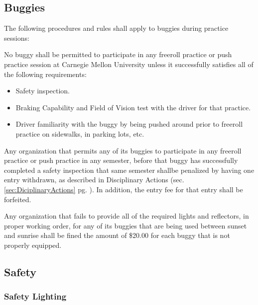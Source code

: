 \subsection{Buggies}
\label{subsec:Freeroll Buggies}

	The following procedures and rules shall apply to buggies during practice sessions:
	\newline

	\noindent No buggy shall be permitted to participate in any freeroll practice or push practice session at Carnegie Mellon University unless it successfully satisfies all of the following requirements:

	\begin{itemize}

		\item Safety inspection.

		\item Braking Capability and Field of Vision test with the driver for that practice.

		\item Driver familiarity with the buggy by being pushed around prior to freeroll practice on sidewalks, in parking lots, etc.

	\end{itemize}

	Any organization that permits any of its buggies to participate in any freeroll practice or push practice in any semester, before that buggy has successfully completed a safety inspection that same semester shallbe penalized by having one entry withdrawn, as described in Disciplinary Actions (sec. \ref{sec:DiciplinaryActions} pg. \pageref{sec:DiciplinaryActions}). 
	In addition, the entry fee for that entry shall be forfeited.

	Any organization that fails to provide all of the required lights and reflectors, in proper working order, for any of its buggies that are being used between sunset and sunrise shall be fined the amount of \$20.00 for each buggy that is not properly equipped.

\subsection{Safety}

\subsubsection{Safety Lighting}

